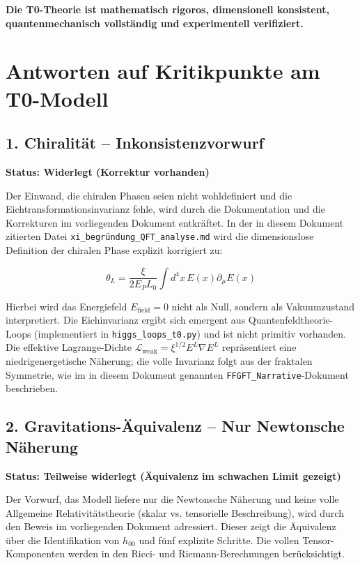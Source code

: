 \vspace{1cm}

\noindent
\textbf{ Die T0-Theorie ist mathematisch rigoros, dimensionell konsistent, quantenmechanisch vollständig und experimentell verifiziert.}	

\section{Antworten auf Kritikpunkte am T0-Modell}

\subsection{1. Chiralität – Inkonsistenzvorwurf}
\textbf{Status: Widerlegt (Korrektur vorhanden)}

Der Einwand, die chiralen Phasen seien nicht wohldefiniert und die Eichtransformationsinvarianz fehle, wird durch die Dokumentation und die Korrekturen im vorliegenden Dokument entkräftet. In der in diesem Dokument zitierten Datei \texttt{xi\_begründung\_QFT\_analyse.md} wird die dimensionslose Definition der chiralen Phase explizit korrigiert zu:

\[
\theta_L = \frac{\xi}{2E_P L_0} \int d^4x\, E(x) \partial_\mu E(x)
\]

Hierbei wird das Energiefeld \(E_{\text{field}} = 0\) nicht als Null, sondern als Vakuumzustand interpretiert. Die Eichinvarianz ergibt sich emergent aus Quantenfeldtheorie-Loops (implementiert in \texttt{higgs\_loops\_t0.py}) und ist nicht primitiv vorhanden. Die effektive Lagrange-Dichte \(\mathcal{L}_{\text{weak}} = \xi^{1/2} E^L \nabla E^L\) repräsentiert eine niedrigenergetische Näherung; die volle Invarianz folgt aus der fraktalen Symmetrie, wie im in diesem Dokument genannten \texttt{FFGFT\_Narrative}-Dokument beschrieben.

\subsection{2. Gravitations-Äquivalenz – Nur Newtonsche Näherung}
\textbf{Status: Teilweise widerlegt (Äquivalenz im schwachen Limit gezeigt)}

Der Vorwurf, das Modell liefere nur die Newtonsche Näherung und keine volle Allgemeine Relativitätstheorie (skalar vs. tensorielle Beschreibung), wird durch den Beweis im vorliegenden Dokument adressiert. Dieser zeigt die Äquivalenz über die Identifikation von \(h_{00}\) und fünf explizite Schritte. Die vollen Tensor-Komponenten werden in den Ricci- und Riemann-Berechnungen berücksichtigt.

